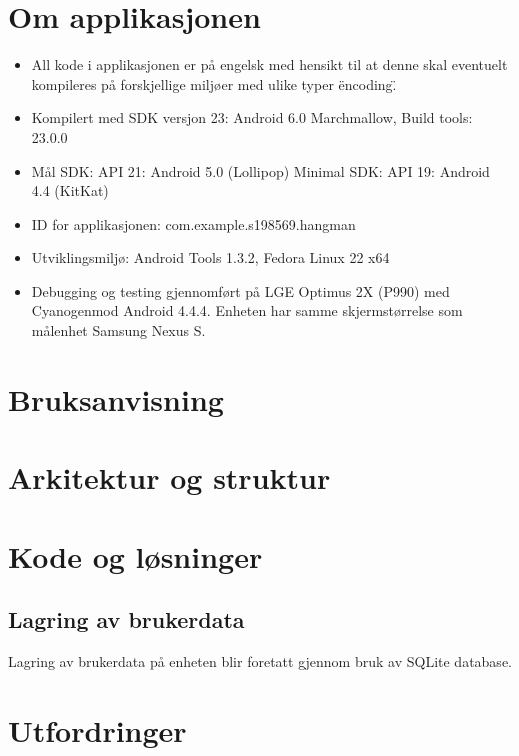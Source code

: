 \chapter{Om applikasjonen}


\begin{itemize}
\item All kode i applikasjonen er på engelsk med hensikt til at denne skal eventuelt kompileres på forskjellige miljøer med ulike typer \"encoding\". 
\item Kompilert med SDK versjon 23: Android 6.0 Marchmallow, Build tools: 23.0.0
\item Mål SDK: API 21: Android 5.0 (Lollipop) Minimal SDK: API 19: Android 4.4 (KitKat)
\item ID for applikasjonen: com.example.s198569.hangman
\item Utviklingsmiljø: Android Tools 1.3.2, Fedora Linux 22 x64
\item Debugging og testing gjennomført på LGE Optimus 2X (P990) med Cyanogenmod Android 4.4.4. Enheten har samme skjermstørrelse som målenhet Samsung Nexus S.
\end{itemize}

\chapter{Bruksanvisning}

\chapter{Arkitektur og struktur}

\chapter{Kode og løsninger}

\section{Lagring av brukerdata}
Lagring av brukerdata på enheten blir foretatt gjennom bruk av SQLite database. 

\chapter{Utfordringer}

